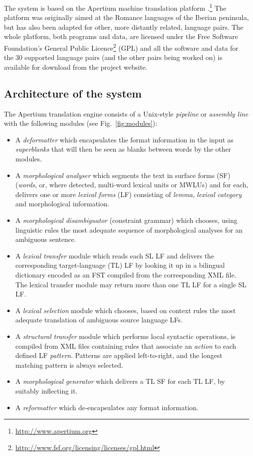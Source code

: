 \documentclass[11pt]{article}
\newenvironment{itemise}[1]{
        \begin{itemize}\setlength{\itemsep}{-0.3em}
        \vspace{-0.6em}
        #1
}{
        \end{itemize}
        \vspace{-1pt}
}
\begin{document}
The system is based on the Apertium machine translation 
platform \citep{apertium/2011}.\footnote{\url{http://www.apertium.org}} The 
platform was originally aimed at the Romance languages of the Iberian peninsula, but has also been adapted for 
other, more distantly related, language pairs.
The whole platform, both programs and data, are licensed under the Free Software Foundation's General Public 
Licence\footnote{\url{http://www.fsf.org/licensing/licenses/gpl.html}} (GPL) and all the software and data for the 
30 supported language pairs (and the other pairs being worked on) is available for download from the project 
website.

\subsection{Architecture of the system}

The Apertium translation engine consists of a Unix-style \emph{pipeline} or
\emph{assembly line} with the following modules (see Fig.~\ref{fig:modules}):  
\begin{itemise}
\item A \emph{deformatter} which encapsulates the format information
 in the input as \emph{superblanks} that will then be seen
 as blanks between words by the other modules.
\item A \emph{morphological analyser} which segments the text in
  surface forms (SF) (\emph{words}, or, where detected, multi-word lexical
  units or MWLUs) and for each, delivers one or more \emph{lexical
    forms} (LF) consisting of \emph{lemma}, \emph{lexical category} and
  morphological information. 
\item A \emph{morphological disambiguator} (constraint grammar) which chooses, using linguistic rules
  the most adequate sequence of morphological analyses for an ambiguous sentence. 
\item A \emph{lexical transfer} module which reads each SL LF 
  and delivers the corresponding target-language (TL) LF
  by looking it up in a bilingual dictionary encoded as an FST
  compiled from the corresponding XML file. The lexical transfer module may
  return more than one TL LF for a single SL LF.
\item A \emph{lexical selection} module which chooses, based on context 
  rules the most adequate translation of ambiguous source language LFs.
\item A \emph{structural transfer} module which
    performs local syntactic operations, is compiled from XML files containing rules that 
    associate an \emph{action} to each defined LF \emph{pattern}. Patterns are applied left-to-right, and the 
    longest matching pattern is always selected.
\item A \emph{morphological generator} which delivers a TL SF
 for each TL LF, by suitably inflecting it. 
\item A \emph{reformatter} which de-encapsulates any format
  information.
\end{itemise}
\end{document}
